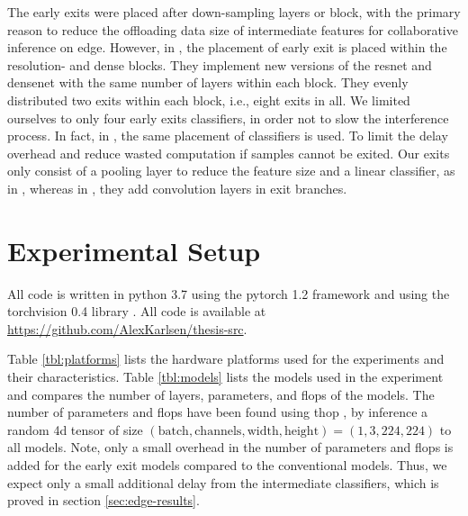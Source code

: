The early exits were placed after down-sampling layers or block, with the primary reason to reduce the offloading data size of intermediate features for collaborative inference on edge. However, in \cite{huang_multi-scale_2017}, the placement of early exit is placed within the resolution- and dense blocks. They implement new versions of the \gls{resnet} and \gls{densenet} with the same number of layers within each block. They evenly distributed two exits within each block, i.e., eight exits in all. We limited ourselves to only four early exits classifiers, in order not to slow the interference process. In fact, in \cite{berestizshevsky_sacrificing_2019}, the same placement of classifiers is used. To limit the delay overhead and reduce wasted computation if samples cannot be exited. Our exits only consist of a pooling layer to reduce the feature size and a linear classifier, as in \cite{kaya_shallow-deep_nodate}, whereas in \cite{teerapittayanon_branchynet:_2016}, they add convolution layers in exit branches. 


\section{Experimental Setup} \label{sec:ee-exp-setup}

All code is written in \gls{python} 3.7 \cite{van_rossum_python_1995} using the \gls{pytorch} 1.2
framework \cite{paszke_automatic_2017} and using the \gls{torchvision} 0.4 library \cite{marcel_torchvision_2010}. All code is available at
{\color{sns-grey}\url{https://github.com/AlexKarlsen/thesis-src}}. 

Table \ref{tbl:platforms} lists the hardware platforms used for the experiments and their characteristics. Table \ref{tbl:models} lists the models used in the experiment and compares the number of layers, parameters, and \acrshort{flop}s of the models. The number of parameters and \acrshort{flop}s have been found using \gls{thop} \cite{zhu_thop_nodate}, by inference a random 4d tensor of size $ (\mathrm{batch,channels,width,height})=(1,3,224,224) $ to all models. Note, only a small overhead in the number of parameters and \acrshort{flop}s is added for the early exit models compared to the conventional models. Thus, we expect only a small additional delay from the intermediate classifiers, which is proved in section \ref{sec:edge-results}.

